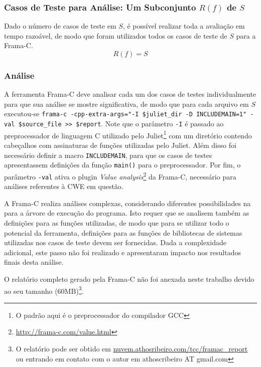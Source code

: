   \subsubsection{Casos de Teste para Análise: Um Subconjunto $R(f)$ de $S$}

  Dado o número de casos de teste em $S$, é possível realizar toda a avaliação em tempo razoável, de modo que foram utilizados todos os casos de teste de $S$ para a Frama-C.
  \begin{equation}
    R(f) = S
  \end{equation}

  \subsubsection{Análise}

  A ferramenta Frama-C deve analisar cada um dos casos de testes individualmente para que sua análise se mostre significativa, de modo que para cada arquivo em $S$ executou-se
  \lstinline[mathescape=false]{frama-c -cpp-extra-args="-I $juliet_dir -D INCLUDEMAIN=1" -val $source_file >> $report}.
  Note que o parâmetro \lstinline{-I} é passado ao preprocessador de linguagem C utilizado pelo Juliet\footnote{O padrão aqui é o preprocessador do compilador GCC} com um diretório contendo cabeçalhos com assinaturas de funções utilizadas pelo Juliet. Além disso foi necessário definir a macro \lstinline{INCLUDEMAIN}, para que os casos de testes apresentassem definições da função \lstinline{main()} para o preprocessador. Por fim, o parâmetro \lstinline{-val} ativa o plugin \textit{Value analysis}\footnote{\url{http://frama-c.com/value.html}} da Frama-C, necessário para análises referentes à CWE em questão.

  A Frama-C realiza análises complexas, considerando diferentes possibilidades na para a árvore de execução do programa. Isto requer que se analisem também as definições para as funções utilizadas, de modo que para se utilizar todo o potencial da ferramenta, definições para as funções de bibliotecas de sistemas utilizadas nos casos de teste devem ser fornecidas. Dada a complexidade adicional, este passo não foi realizado e apresentaram impacto nos resultados finais desta análise.

  O relatório completo gerado pela Frama-C não foi anexada neste trabalho devido ao seu tamanho (60MB)\footnote{O relatório pode ser obtido em \url{nuvem.athosribeiro.com/tcc/framac_report} ou entrando em contato com o autor em athoscribeiro AT gmail.com}.


